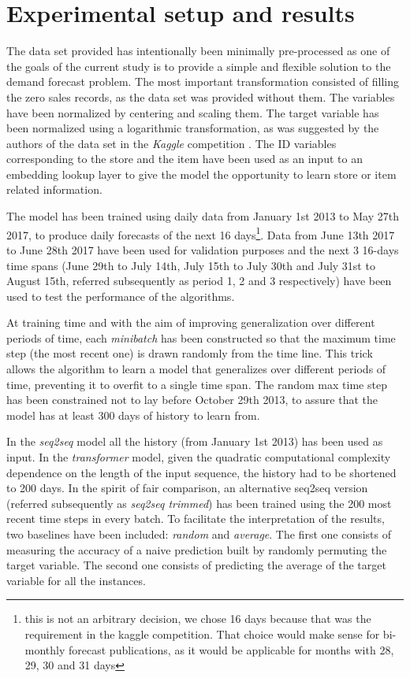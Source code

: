 \documentclass{elsarticle}
\begin{document}
    
	\section{Experimental setup and results} \label{sec:results}
	The data set provided has intentionally been minimally pre-processed as one of the goals of the current study is to provide a simple and flexible solution to the demand forecast problem. The most important transformation consisted of filling the zero sales records, as the data set was provided without them. The variables have been normalized by centering and scaling them. The target variable has been normalized using a logarithmic transformation, as was suggested by the authors of the data set in the \textit{Kaggle} competition \cite{corporacionfavoritadataset2018}. The ID variables corresponding to the store and the item have been used as an input to an embedding lookup layer to give the model the opportunity to learn store or item related information.
	
	The model has been trained using daily data from January 1st 2013 to May 27th 2017, to produce daily forecasts of the next 16 days\footnote{this is not an arbitrary decision, we chose 16 days because that was the requirement in the kaggle competition. That choice would make sense for bi-monthly forecast publications, as it would be applicable for months with 28, 29, 30 and 31 days}. Data from  June 13th 2017 to June 28th 2017 have been used for validation purposes and the next 3 16-days time spans (June 29th to July 14th, July 15th to July 30th and July 31st to August 15th, referred subsequently as period 1, 2 and 3 respectively) have been used to test the performance of the algorithms.
	
	At training time and with the aim of improving generalization over different periods of time, each \textit{minibatch} has been constructed so that the maximum time step (the most recent one)  is drawn randomly from the time line. This trick allows the algorithm to learn a model that generalizes over different periods of time, preventing it to overfit to a single time span. The random max time step has been constrained not to lay before October 29th 2013, to assure that the model has at least 300 days of history to learn from. 
	
	In the \textit{seq2seq} model all the history (from January 1st 2013) has been used as input.  In the \textit{transformer} model, given the quadratic computational complexity dependence on the length of the input sequence, the history had to be shortened to 200 days. In the spirit of fair comparison, an alternative seq2seq version (referred subsequently as \textit{seq2seq trimmed}) has been trained using the 200 most recent time steps in every batch. To facilitate the interpretation of the results, two baselines have been included: \textit{random} and \textit{average}. The first one consists of measuring the accuracy of a naive prediction built by randomly permuting the target variable. The second one consists of predicting the average of the target variable for all the instances. 
	
\end{document}
